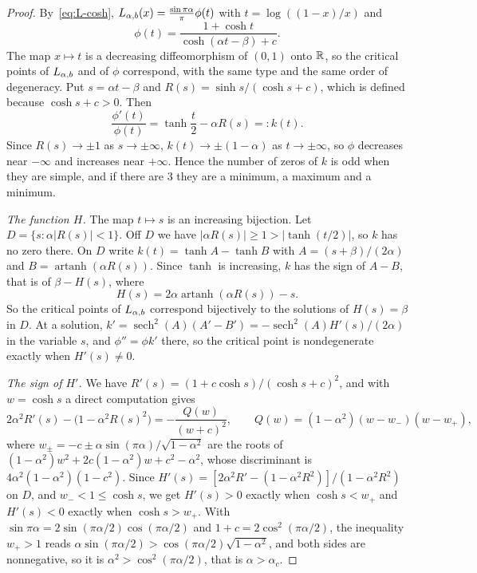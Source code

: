 \begin{proof}
By~\eqref{eq:L-cosh}, $L_{\alpha,b}(x)=\frac{\sin\pi\alpha}\pi\phi(t)$ with $t=\log((1-x)/x)$ and
\[
 \phi(t)=\frac{1+\cosh t}{\cosh(\alpha t-\beta)+c}.
\]
The map $x\mapsto t$ is a decreasing diffeomorphism of $(0,1)$ onto $\mathbb{R}$, so the critical
points of $L_{\alpha,b}$ and of $\phi$ correspond, with the same type and the same order of
degeneracy. Put $s=\alpha t-\beta$ and $R(s)=\sinh s/(\cosh s+c)$, which is defined because
$\cosh s+c>0$. Then
\[
 \frac{\phi'(t)}{\phi(t)}=\tanh\frac t2-\alpha R(s)=:k(t).
\]
Since $R(s)\to\pm1$ as $s\to\pm\infty$, $k(t)\to\pm(1-\alpha)$ as $t\to\pm\infty$, so $\phi$
decreases near $-\infty$ and increases near $+\infty$. Hence the number of zeros of $k$ is
odd when they are simple, and if there are $3$ they are a minimum, a maximum and a minimum.

\emph{The function $H$.} The map $t\mapsto s$ is an increasing bijection. Let
$D=\{s:\alpha|R(s)|<1\}$. Off $D$ we have $|\alpha R(s)|\ge1>|\tanh(t/2)|$, so $k$ has no zero
there. On $D$ write $k(t)=\tanh A-\tanh B$ with $A=(s+\beta)/(2\alpha)$ and
$B=\operatorname{artanh}(\alpha R(s))$. Since $\tanh$ is increasing, $k$ has the sign of $A-B$,
that is of $\beta-H(s)$, where
\[
 H(s)=2\alpha\operatorname{artanh}(\alpha R(s))-s .
\]
So the critical points of $L_{\alpha,b}$ correspond bijectively to the solutions of $H(s)=\beta$ in
$D$. At a solution, $k'=\operatorname{sech}^2(A)(A'-B')=-\operatorname{sech}^2(A)H'(s)/(2\alpha)$ in the
variable $s$, and $\phi''=\phi k'$ there, so the critical point is nondegenerate exactly when
$H'(s)\ne0$.

\emph{The sign of $H'$.} We have $R'(s)=(1+c\cosh s)/(\cosh s+c)^2$, and with $w=\cosh s$ a
direct computation gives
\[
 2\alpha^2R'(s)-\bigl(1-\alpha^2R(s)^2\bigr)=-\frac{Q(w)}{(w+c)^2},\qquad
 Q(w)=(1-\alpha^2)(w-w_\minus)(w-w_\plus),
\]
where $w_\pm=-c\pm\alpha\sin(\pi\alpha)/\sqrt{1-\alpha^2}$ are the roots of
$(1-\alpha^2)w^2+2c(1-\alpha^2)w+c^2-\alpha^2$, whose discriminant is $4\alpha^2(1-\alpha^2)(1-c^2)$.
Since $H'(s)=[2\alpha^2R'-(1-\alpha^2R^2)]/(1-\alpha^2R^2)$ on $D$, and $w_\minus<1\le\cosh s$, we get
$H'(s)>0$ exactly when $\cosh s<w_\plus$ and $H'(s)<0$ exactly when $\cosh s>w_\plus$. With
$\sin\pi\alpha=2\sin(\pi\alpha/2)\cos(\pi\alpha/2)$ and $1+c=2\cos^2(\pi\alpha/2)$, the inequality
$w_\plus>1$ reads $\alpha\sin(\pi\alpha/2)>\cos(\pi\alpha/2)\sqrt{1-\alpha^2}$, and both sides are
nonnegative, so it is $\alpha^2>\cos^2(\pi\alpha/2)$, that is $\alpha>\alpha_c$.


\end{proof}
